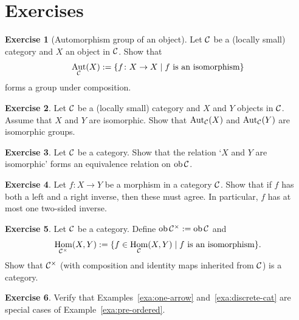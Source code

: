 \documentclass[11pt]{amsbook}
\DeclareMathOperator{\Aut}{\mathrm{Aut}}
\DeclareMathOperator\Hom{Hom}
\DeclareMathOperator\Mod{{\bf{Mod}}}
\DeclareMathOperator\coker{coker}
\DeclareMathOperator\ob{ob}
\def\Grp{\mathbf{Grp}}
\def\Mod{\mathbf{Mod}}
\theoremstyle{plain}
\theoremstyle{definition}
\newtheorem{exercise}{Exercise}
\begin{document}
\newpage
\section*{Exercises}

\begin{exercise}[Automorphism group of an object]
Let ${\mathcal{C}}$ be a (locally small) category and $X$ an object in ${\mathcal{C}}$. Show that
\[
	\Aut_\cC(X) := \{ f\colon X\to X \mid \text{$f$ is an isomorphism} \}
\]
forms a group under composition.
\end{exercise}

\begin{exercise}
Let ${\mathcal{C}}$ be a (locally small) category and $X$ and $Y$ objects in ${\mathcal{C}}$. Assume that $X$ and $Y$ are isomorphic. Show that $\Aut_\cC(X)$ and $\Aut_\cC(Y)$ are isomorphic groups.
\end{exercise}

\begin{exercise}
Let ${\mathcal{C}}$ be a category. Show that the relation `$X$ and $Y$ are isomorphic' forms an equivalence relation on $\ob \cC$.
\end{exercise}

\begin{exercise}
Let $f\colon X\to Y$ be a morphism in a category ${\mathcal{C}}$. Show that if $f$ has both a left and a right inverse, then these must agree. In particular, $f$ has at most one two-sided inverse.
\end{exercise}

\begin{exercise}\label{exc:iso-category}
Let ${\mathcal{C}}$ be a category. Define $\ob \cC^\times := \ob \cC$ and
\[
	\Hom_{\cC^\times}(X,Y) := \{ f \in \Hom_\cC(X,Y) \mid \text{$f$ is an isomorphism} \}.
\]
Show that ${\mathcal{C}}^\times$ (with composition and identity maps inherited from ${\mathcal{C}}$) is a category.
\end{exercise}

\begin{exercise}Verify that Examples~\ref{exa:one-arrow}  and~\ref{exa:discrete-cat} are special cases of Example~\ref{exa:pre-ordered}.
\end{exercise}

%
%
\end{document}

